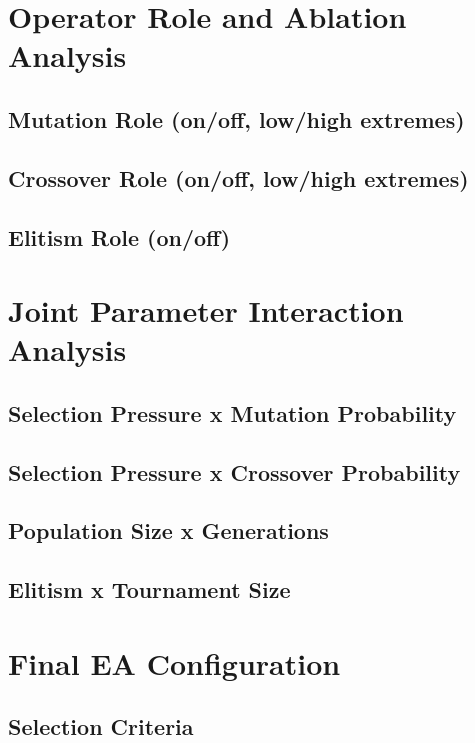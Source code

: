 \documentclass[12pt,a4paper]{report}
\begin{document}
\chapter{Operator Role and Ablation Analysis}
\section{Mutation Role (on/off, low/high extremes)}

\section{Crossover Role (on/off, low/high extremes)}

\section{Elitism Role (on/off)}

\chapter{Joint Parameter Interaction Analysis}
\section{Selection Pressure x Mutation Probability}

\section{Selection Pressure x Crossover Probability}

\section{Population Size x Generations}

\section{Elitism x Tournament Size}

\chapter{Final EA Configuration}
\section{Selection Criteria}
\end{document}
